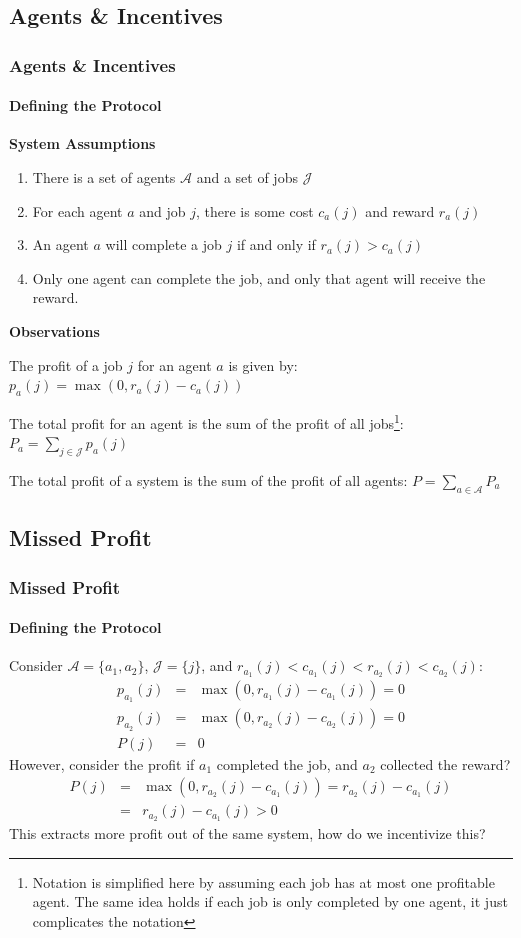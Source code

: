 \documentclass[
	10pt, %
	aspectratio=169, %
]{beamer}
\begin{document}
\subsection{Agents \& Incentives}
\begin{frame}
	\frametitle{Agents \& Incentives}
	\framesubtitle{Defining the Protocol}

	{
		\large \bf
		System Assumptions
	}
	\begin{enumerate}
		\item There is a set of agents $\mathcal{A}$ and a set of jobs $\mathcal{J}$
		\item For each agent $a$ and job $j$, there is some cost $c_a(j)$ and reward $r_a(j)$
		\item An agent $a$ will complete a job $j$ if and only if $r_a(j) > c_a(j)$
		\item Only one agent can complete the job, and only that agent will receive the reward.
	\end{enumerate}

	\medskip

	{
		\large \bf
		Observations
	}
	
	\smallskip

	The profit of a job $j$ for an agent $a$ is given by: $ p_a(j) = \max(0, r_a(j) - c_a(j)) $ 

	\smallskip

	The total profit for an agent is the sum of the profit of all jobs\footnote{Notation is simplified here by assuming each job has at most one profitable agent. The same idea holds if each job is only completed by one agent, it just complicates the notation}: $ P_a = \sum_{j \in \mathcal{J}} p_a(j)$

	\smallskip

	The total profit of a system is the sum of the profit of all agents: $ P = \sum_{a \in \mathcal{A}} P_a $

\end{frame}

\subsection{Missed Profit}
\begin{frame}
	\frametitle{Missed Profit}
	\framesubtitle{Defining the Protocol}

	Consider $\mathcal{A} = \{ a_1, a_2 \}$, $\mathcal{J} = \{ j \}$, and $r_{a_1}(j) < c_{a_1}(j) < r_{a_2}(j) < c_{a_2}(j)$:
	\begin{eqnarray*}
		p_{a_1}(j) &=& \max(0, r_{a_1}(j) - c_{a_1}(j)) = 0 \\
		p_{a_2}(j) &=& \max(0, r_{a_2}(j) - c_{a_2}(j)) = 0 \\
		P(j) &=& 0
	\end{eqnarray*}
	However, consider the profit if $a_1$ completed the job, and $a_2$ collected the reward?
	\begin{eqnarray*}
		P(j) &=& \max(0, r_{a_2}(j) - c_{a_1}(j)) = r_{a_2}(j) - c_{a_1}(j) \\
		&=& r_{a_2}(j) - c_{a_1}(j) > 0
	\end{eqnarray*}
	This extracts more profit out of the same system, how do we incentivize this?
\end{frame}
\end{document}
